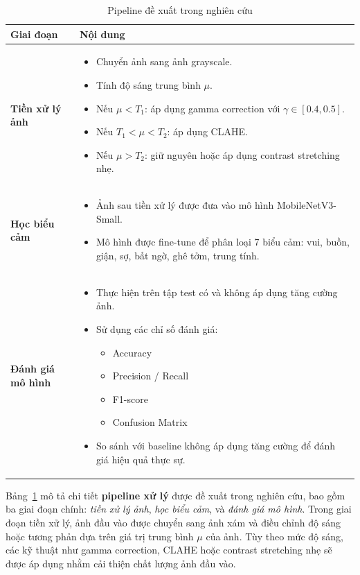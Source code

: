 \begin{table}[H]
\centering
\caption{Pipeline đề xuất trong nghiên cứu}
\label{tab:pipeline}
\begin{tabular}{|p{4cm}|p{10cm}|}
\hline
\textbf{Giai đoạn} & \textbf{Nội dung} \\
\hline
\textbf{Tiền xử lý ảnh} &
\begin{itemize}[leftmargin=*]
    \item Chuyển ảnh sang ảnh grayscale.
    \item Tính độ sáng trung bình $\mu$.
    \item Nếu $\mu < T_1$: áp dụng gamma correction với $\gamma \in [0.4, 0.5]$.
    \item Nếu $T_1 < \mu < T_2$: áp dụng CLAHE.
    \item Nếu $\mu > T_2$: giữ nguyên hoặc áp dụng contrast stretching nhẹ.
\end{itemize} \\
\hline
\textbf{Học biểu cảm} &
\begin{itemize}[leftmargin=*]
    \item Ảnh sau tiền xử lý được đưa vào mô hình MobileNetV3-Small.
    \item Mô hình được fine-tune để phân loại 7 biểu cảm: vui, buồn, giận, sợ, bất ngờ, ghê tởm, trung tính.
\end{itemize} \\
\hline
\textbf{Đánh giá mô hình} &
\begin{itemize}[leftmargin=*]
    \item Thực hiện trên tập test có và không áp dụng tăng cường ảnh.
    \item Sử dụng các chỉ số đánh giá:
    \begin{itemize}
        \item Accuracy
        \item Precision / Recall
        \item F1-score
        \item Confusion Matrix
    \end{itemize}
    \item So sánh với baseline không áp dụng tăng cường để đánh giá hiệu quả thực sự.
\end{itemize} \\
\hline
\end{tabular}
\end{table}

Bảng~\ref{tab:pipeline} mô tả chi tiết \textbf{pipeline xử lý} được đề xuất trong nghiên cứu, bao gồm ba giai đoạn chính: \textit{tiền xử lý ảnh}, \textit{học biểu cảm}, và \textit{đánh giá mô hình}. Trong giai đoạn tiền xử lý, ảnh đầu vào được chuyển sang ảnh xám và điều chỉnh độ sáng hoặc tương phản dựa trên giá trị trung bình $\mu$ của ảnh. Tùy theo mức độ sáng, các kỹ thuật như gamma correction, CLAHE hoặc contrast stretching nhẹ sẽ được áp dụng nhằm cải thiện chất lượng ảnh đầu vào.

